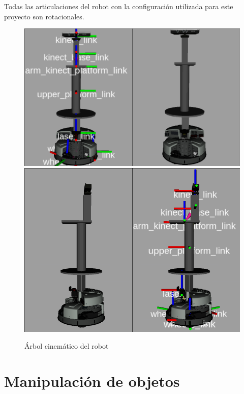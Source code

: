Todas las articulaciones del robot con la configuración utilizada para este proyecto son rotacionales.

\begin{figure}[ht]
    \centering
    \includegraphics[scale=0.3]{Figures/Robotino_model_front.png}
    \includegraphics[scale=0.3]{Figures/Robotino_model_side.png} 
        \caption{Árbol cinemático del robot}
        \label{fig:Robotino_models}
\end{figure}

\section{Manipulación de objetos}

